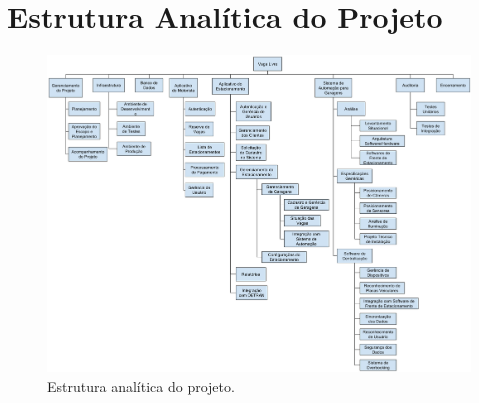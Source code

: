 
\chapter{Estrutura Analítica do Projeto}\label{ch:wbs}

%

\begin{figure}[h]
	\includegraphics[height=.9\textwidth,angle=90]{images/wbs}
	\caption{Estrutura analítica do projeto.}
	\label{fig:wbs}
\end{figure}